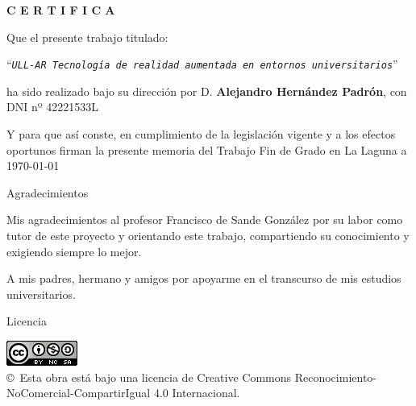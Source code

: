 \documentclass[spanish,a4paper,12pt,oneside]{extreport}
\newcommand{\BulletP}{\texttt{ULL-AR{ Tecnología de realidad aumentada en entornos universitarios}}}
\begin{document}
\bigskip

\bigskip
\bigskip
{\bf C E R T I F I C A}

\bigskip
\bigskip
\bigskip
Que el presente trabajo titulado:

\bigskip
``{\it \BulletP{}}''

\bigskip
\bigskip
\bigskip
\noindent ha sido realizado bajo su dirección por D. {\bf Alejandro Hernández Padrón}, con DNI nº 42221533L

\bigskip
\bigskip

Y para que así conste, en cumplimiento de la legislación vigente y a los efectos
oportunos firman la presente memoria del Trabajo Fin de Grado en La Laguna a \today

\newpage
\thispagestyle{empty}

{ \flushright

\begin{LARGE}
Agradecimientos
\end{LARGE}

\hspace{3mm}

\begin{large}


\hspace{3mm}
Mis agradecimientos al profesor Francisco de Sande González por
su labor como tutor de este proyecto y orientando este trabajo,
compartiendo su conocimiento y exigiendo siempre lo mejor.


\hspace{3mm}
A mis padres, hermano y amigos por apoyarme en el transcurso de mis 
estudios universitarios. 
\end{large}

}

\newpage

\begin{huge}
Licencia
\end{huge}

\bigskip

\begin{center}
\includegraphics[scale=1.5]{images/by-nc-sa_88x31}\\[10mm]
{\Large \copyright~Esta obra está bajo una licencia de Creative Commons Reconocimiento-NoComercial-CompartirIgual 4.0 Internacional.
}
\end{center}
\end{document}
